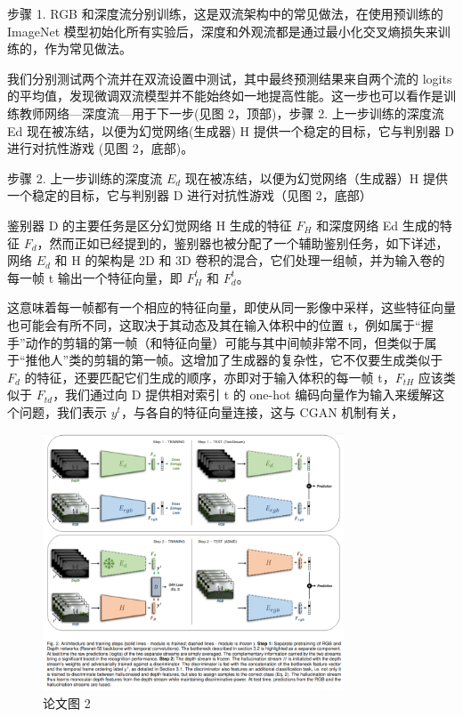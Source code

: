 步骤 1. RGB 和深度流分别训练，这是双流架构中的常见做法，在使用预训练的 ImageNet 模型初始化所有实验后，深度和外观流都是通过最小化交叉熵损失来训练的，作为常见做法。

我们分别测试两个流并在双流设置中测试，其中最终预测结果来自两个流的 logits 的平均值，发现微调双流模型并不能始终如一地提高性能。这一步也可以看作是训练教师网络—深度流—用于下一步(见图 2，顶部)，步骤 2. 上一步训练的深度流 Ed 现在被冻结，以便为幻觉网络(生成器) H 提供一个稳定的目标，它与判别器 D 进行对抗性游戏 (见图 2，底部)。

步骤 2. 上一步训练的深度流 $E_{d}$ 现在被冻结，以便为幻觉网络（生成器）H 提供一个稳定的目标，它与判别器 D 进行对抗性游戏（见图 2，底部）

鉴别器 D 的主要任务是区分幻觉网络 H 生成的特征 $F_{H}$ 和深度网络 Ed 生成的特征 $F_{d}$，然而正如已经提到的，鉴别器也被分配了一个辅助鉴别任务，如下详述，网络 $E_{d}$ 和 H 的架构是 2D 和 3D 卷积的混合，它们处理一组帧，并为输入卷的每一帧 t 输出一个特征向量，即 $F^{t}_{H}$ 和 $F^{t}_{d}$。

这意味着每一帧都有一个相应的特征向量，即使从同一影像中采样，这些特征向量也可能会有所不同，这取决于其动态及其在输入体积中的位置 t，例如属于“握手”动作的剪辑的第一帧（和特征向量）可能与其中间帧非常不同，但类似于属于“推他人”类的剪辑的第一帧。这增加了生成器的复杂性，它不仅要生成类似于 $F_{d}$ 的特征，还要匹配它们生成的顺序，亦即对于输入体积的每一帧 t，$F_{tH}$ 应该类似于 $F_{td}$，我们通过向 D 提供相对索引 t 的 one-hot 编码向量作为输入来缓解这个问题，我们表示 $y^{t}$，与各自的特征向量连接，这与 CGAN 机制有关，

\begin{figure}[htb]
\centering 
\includegraphics[width=0.80\textwidth]{img/c1m2.png} 
\caption{论文图 2}
\label{Test}
\end{figure}

